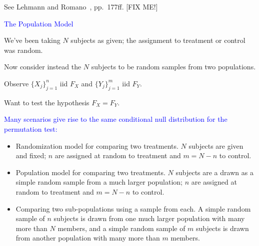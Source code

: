 \documentclass[landscape]{slides}
\begin{document}
\begin{slide}
\begin{slide}
See Lehmann and Romano~\cite{lehmannRomano05}, pp.~177ff. [FIX ME!]


\end{slide}


\begin{slide}
{\textcolor{blue}{The Population Model}}

We've been taking $N$ subjects as given; the assignment to treatment or
control was random.

Now consider instead the $N$ subjects to
be random samples from two populations.

Observe $\{X_j\}_{j=1}^n$ iid $F_X$ and $\{Y_j\}_{j=1}^m$ iid $F_Y$.

Want to test the hypothesis $F_X = F_Y$.

\end{slide}

\begin{slide}
{\textcolor{blue}{Many scenarios give rise to the same conditional null distribution for the
permutation test:}}

\begin{itemize}
   \item
       Randomization model for comparing two treatments. 
       $N$ subjects are given and fixed; $n$ are assigned at random to treatment 
       and $m=N-n$ to control.

  \item 
       Population model for comparing two treatments. $N$ subjects are a drawn as a simple 
       random sample from a much larger population; $n$ are assigned at random to treatment 
       and $m=N-n$ to control.

\end{itemize}

\end{slide}

\begin{slide}

\begin{itemize}  
  \item
      Comparing two sub-populations using a sample from each. 
      A simple random sample of $n$ subjects is drawn from one much larger population
      with many more than $N$ members, and a simple random sample of $m$ subjects 
      is drawn from another population with many more than $m$ members. 
      

\end{itemize}
\end{slide}
\end{slide}
\end{document}
